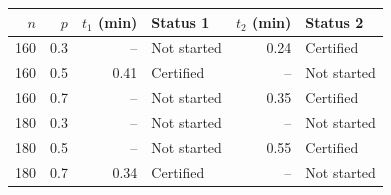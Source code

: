 \begin{tabular}{rr rlr l}
\toprule
$n$ & $p$ & $t_1$ (min) & Status 1 & $t_2$ (min) & Status 2 \\
\midrule
160 & 0.3 & -- & Not started & 0.24 & Certified \\
160 & 0.5 & 0.41 & Certified & -- & Not started \\
160 & 0.7 & -- & Not started & 0.35 & Certified \\
180 & 0.3 & -- & Not started & -- & Not started \\
180 & 0.5 & -- & Not started & 0.55 & Certified \\
180 & 0.7 & 0.34 & Certified & -- & Not started \\
\bottomrule
\end{tabular}
